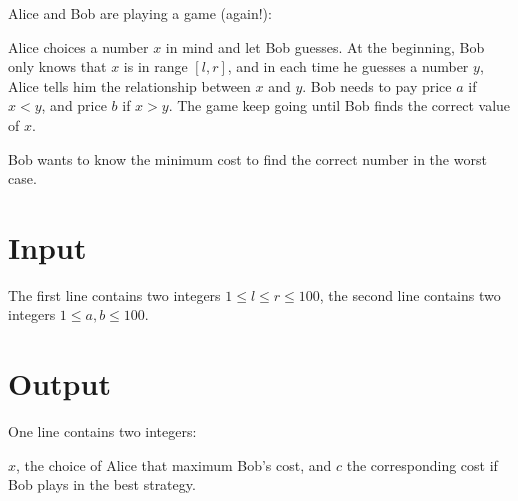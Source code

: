 Alice and Bob are playing a game (again!):

Alice choices a number $x$ in mind and let Bob guesses.
At the beginning, Bob only knows that $x$ is in range $[l, r]$,
and in each time he guesses a number $y$, Alice tells him the relationship between $x$ and $y$.
Bob needs to pay price $a$ if $x<y$, and price $b$ if $x>y$.
The game keep going until Bob finds the correct value of $x$.

Bob wants to know the minimum cost to find the correct number in the worst case.

\section{Input}
The first line contains two integers $1 \le l \le r \le 100$,
the second line contains two integers $1 \le a, b \le 100$.


\section{Output}
One line contains two integers:

 $x$, the choice of Alice that maximum Bob's cost,
 and $c$ the corresponding cost if Bob plays in the best strategy.
